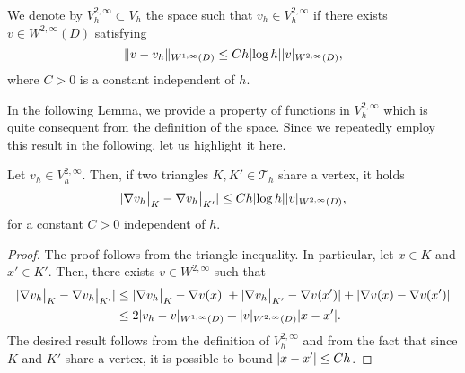 \documentclass[10pt]{article}
\begin{document}
\begin{definition}\label{def:Vh2Inf} We denote by $V_h^{2, \infty} \subset V_h$ the space such that $v_h \in V_h^{2, \infty}$ if there exists $v \in W^{2, \infty}(D)$ satisfying
	\begin{equation}
		\lVert v - v_h\rVert_{W^{1, \infty}(D)} \leq C h \lvert\log h\rvert \lvert v\rvert_{W^{2, \infty}(D)},
	\end{equation} 
	where $C > 0$ is a constant independent of $h$.
\end{definition}

In the following Lemma, we provide a property of functions in $V_h^{2, \infty}$ which is quite consequent from the definition of the space. Since we repeatedly employ this result in the following, let us highlight it here.
\begin{lemma}\label{lem:Vh2InfPropr} Let $v_h \in V_h^{2, \infty}$. Then, if two triangles $K, K' \in \mathcal T_h$ share a vertex, it holds
	\begin{equation}
		\lvert\nabla v_h \bigr\rvert_{K} - \nabla v_h \bigr\rvert_{K'}\rvert \leq Ch \lvert\log h\rvert \lvert v\rvert_{W^{2, \infty}(D)},
	\end{equation} 
	for a constant $C > 0$ independent of $h$.
\end{lemma}
\begin{proof} The proof follows from the triangle inequality. In particular, let $x \in K$ and $x' \in K'$. Then, there exists $v \in W^{2, \infty}$ such that
	\begin{equation}
	\begin{aligned}
		\lvert\nabla v_h \bigr\rvert_{K} - \nabla v_h \bigr\rvert_{K'}\rvert &\leq \lvert\nabla v_h \bigr\rvert_{K} - \nabla v(x)\rvert + \lvert\nabla v_h \bigr\rvert_{K'} - \nabla v (x')\rvert + \lvert\nabla v (x) - \nabla v (x')\rvert\\
		&\leq 2 \lvert v_h - v\rvert_{W^{1, \infty}(D)} + \lvert v\rvert_{W^{2, \infty}(D)}\lvert x - x'\rvert.
	\end{aligned}
	\end{equation}
	The desired result follows from the definition of $V_h^{2, \infty}$ and from the fact that since $K$ and $K'$ share a vertex, it is possible to bound $\lvert x - x'\rvert \leq Ch$.
\end{proof}
\end{document}
